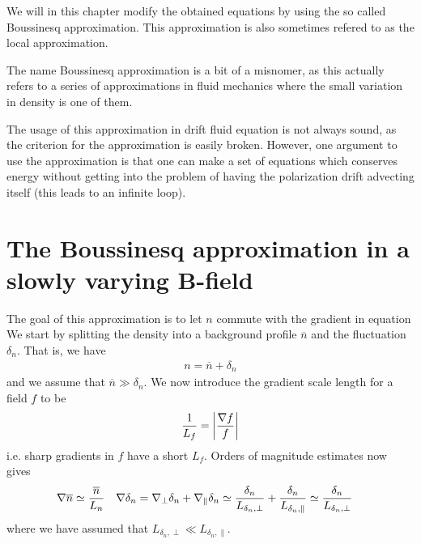 We will in this chapter modify the obtained equations by using the so called Boussinesq approximation.
This approximation is also sometimes refered to as the local approximation.

The name Boussinesq approximation is a bit of a misnomer, as this actually refers to a series of approximations in fluid mechanics where the small variation in density is one of them.

The usage of this approximation in drift fluid equation is not always sound, as the criterion for the approximation is easily broken.
However, one argument to use the approximation is that one can make a set of equations which conserves energy without getting into the problem of having the polarization drift advecting itself (this leads to an infinite loop).

\section{The Boussinesq approximation in a slowly varying B-field}
\label{sec:boussinesq}
%
The goal of this approximation is to let $n$ commute with the gradient in equation
We start by splitting the density into a background profile $\overline{n}$ and the fluctuation $\delta_n$.
That is, we have
%
\begin{align*}
    n = \overline{n} + \delta_n
\end{align*}
%
%
%
and we assume that $\overline{n} \gg \delta_n$.
We now introduce the gradient scale length for a field $f$ to be
%
\begin{align*}
    \frac{1}{L_f} = \left|\frac{\nabla f}{f}\right|
\end{align*}
%
i.e. sharp gradients in $f$ have a short $L_f$.
Orders of magnitude estimates now gives
%
\begin{align*}
    &\nabla \overline{n} \simeq \frac{\overline{n}}{L_n}&
    &\nabla \delta_n
    =
    \nabla_\perp \delta_n + \nabla_\| \delta_n
    \simeq \frac{\delta_n}{L_{\delta_n, \perp}} + \frac{\delta_n}{L_{\delta_n, \|}}
    \simeq \frac{\delta_n}{L_{\delta_n, \perp}}
    &
\end{align*}
%
where we have assumed that $L_{\delta_n, \perp} \ll L_{\delta_n, \|}$.

